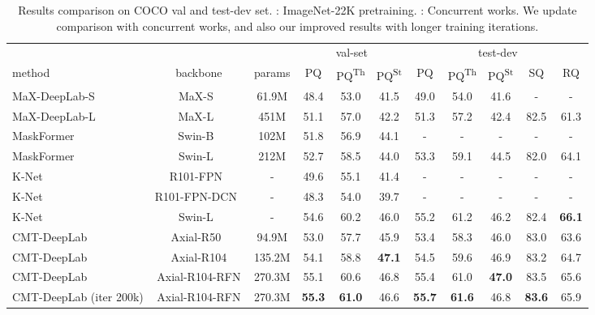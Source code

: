 \documentclass[10pt,twocolumn,letterpaper]{article}
\newcommand{\tablestyle}[2]{\setlength{\tabcolsep}{#1}\renewcommand{\arraystretch}{#2}\centering\footnotesize}
\begin{document}
\begin{table*}[!t]
\centering
\small
\tablestyle{7pt}{1.1}
\begin{tabular}{l|c|c|ccc|ccccc}
 &  &   & \multicolumn{3}{c}{val-set} & \multicolumn{5}{c}{test-dev}\\
method & backbone & params & PQ & PQ\textsuperscript{Th} & PQ\textsuperscript{St} & PQ & PQ\textsuperscript{Th} & PQ\textsuperscript{St} & SQ & RQ\\
 \shline
MaX-DeepLab-S~\cite{wang2021max} & MaX-S~\cite{wang2021max} & 61.9M & 48.4 & 53.0 & 41.5 & 49.0 & 54.0 & 41.6 & - & - \\
MaX-DeepLab-L~\cite{wang2021max} & MaX-L~\cite{wang2021max} & 451M & 51.1 & 57.0 & 42.2 & 51.3 & 57.2 & 42.4 & 82.5 & 61.3 \\
\hline
MaskFormer~\cite{cheng2021per} & Swin-B~\cite{liu2021swin} & 102M & 51.8 & 56.9 & 44.1 & - & - & -  & - & - \\
MaskFormer~\cite{cheng2021per} & Swin-L~\cite{liu2021swin} & 212M & 52.7 & 58.5 & 44.0 & 53.3 & 59.1 & 44.5 & 82.0 & 64.1 \\
K-Net~\cite{zhang2021k} & R101-FPN~\cite{lin2017feature} & - &  49.6 & 55.1 & 41.4 & - & - & - & - & -  \\
K-Net~\cite{zhang2021k} & R101-FPN-DCN~\cite{dai2017deformable} & - &  48.3 & 54.0 & 39.7 & - & - & - & - & -  \\
K-Net~\cite{zhang2021k} & Swin-L~\cite{liu2021swin} & - &  54.6 & 60.2 & 46.0 & 55.2 & 61.2 & 46.2 & 82.4 & \textbf{66.1} \\
\hline \hline
CMT-DeepLab & Axial-R50~\cite{wang2020axial} & 94.9M & 53.0 & 57.7 & 45.9 & 53.4 & 58.3 & 46.0 & 83.0 & 63.6 \\
CMT-DeepLab & Axial-R104 & 135.2M & 54.1 & 58.8 & \textbf{47.1} & 54.5 & 59.6 & 46.9 & 83.2 & 64.7 \\
CMT-DeepLab & Axial-R104-RFN & 270.3M & 55.1 & 60.6 & 46.8 & 55.4 & 61.0 & \textbf{47.0} & 83.5 & 65.6 \\
CMT-DeepLab (iter 200k) & Axial-R104-RFN & 270.3M & \textbf{55.3} & \textbf{61.0} & 46.6 & \textbf{55.7} & \textbf{61.6} & 46.8 & \textbf{83.6} & 65.9 \\
\end{tabular}
\caption{Results comparison on COCO val and test-dev set. : ImageNet-22K pretraining. : Concurrent works. We update comparison with concurrent works, and also our improved results with longer training iterations.
}
\label{tab:supp_coco_val_test}
\end{table*}
\end{document}

